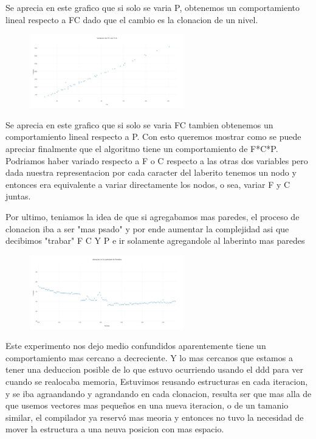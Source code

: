 \documentclass[spanish,12pt]{article}
\begin{document}
Se aprecia en este grafico que si solo se varia P, obtenemos un comportamiento lineal respecto a FC dado que el cambio es la clonacion de un nivel.


\begin{figure}[H]
\centering
\includegraphics     [width=0.6\textwidth]{pfijo}
\caption{}
\end{figure}
Se aprecia en este grafico que si solo se varia FC tambien obtenemos un comportamiento lineal respecto a P.
Con esto queremos mostrar como se puede apreciar finalmente que el algoritmo tiene un comportamiento de F*C*P. Podriamos haber variado respecto a F o C respecto a las otras dos variables pero dada nuestra representacion
por cada caracter del laberito tenemos un nodo y entonces era equivalente a variar directamente los nodos, o sea, variar F y C juntas.





Por ultimo, teniamos la idea de que si agregabamos mas paredes, el proceso de clonacion iba a ser "mas psado" y por ende aumentar la complejidad asi que decibimos "trabar" F C Y P e ir solamente agregandole al laberinto mas paredes
\begin{figure}[H]
\centering
\includegraphics     [width=0.6\textwidth]{paredesfijas}
\caption{}
\end{figure}

Este experimento nos dejo medio confundidos aparentemente tiene un comportamiento mas cercano a decreciente. Y lo mas cercanos que estamos a tener una deduccion posible de lo que estuvo ocurriendo  usando el ddd para ver cuando se realocaba memoria,
Estuvimos reusando estructuras en cada iteracion, y se iba agraandando y agrandando en cada clonacion,  resulta ser que mas alla de que usemos vectores mas pequeños en una nueva iteracion, o de un tamanio similar, el compilador ya reservó mas meoria y entonces no tuvo la necesidad de mover la estructura a una neuva posicion con mas espacio.
\end{document}
